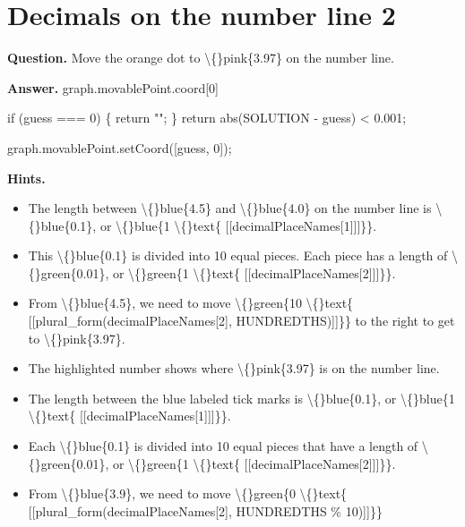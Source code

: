 \documentclass{article}
\begin{document}
\section*{Decimals on the number line 2}
\textbf{Question.} Move the orange dot to \textbackslash\{\}pink\{3.97\} on the number line.

\textbf{Answer.} graph.movablePoint.coord[0] 
                
                    if (guess === 0) \{
                        return "";
                    \}
                    return abs(SOLUTION - guess) < 0.001;
                
                
                    graph.movablePoint.setCoord([guess, 0]);

\textbf{Hints.}
\begin{itemize}
  \item The length between \textbackslash\{\}blue\{4.5\} and \textbackslash\{\}blue\{4.0\}
                    on the number line is \textbackslash\{\}blue\{0.1\},
                    or \textbackslash\{\}blue\{1 \textbackslash\{\}text\{ [[decimalPlaceNames[1]]]\}\}.
  \item This \textbackslash\{\}blue\{0.1\} is divided into 10 equal pieces.
                    Each piece has a length of \textbackslash\{\}green\{0.01\},
                    or \textbackslash\{\}green\{1 \textbackslash\{\}text\{ [[decimalPlaceNames[2]]]\}\}.
  \item From \textbackslash\{\}blue\{4.5\}, we need to move 
                        \textbackslash\{\}green\{10 \textbackslash\{\}text\{ [[plural\_form(decimalPlaceNames[2], HUNDREDTHS)]]\}\}
                        to the right to get to \textbackslash\{\}pink\{3.97\}.
  \item The highlighted number shows where \textbackslash\{\}pink\{3.97\} is on the number line.
  \item The length between the blue labeled tick marks is \textbackslash\{\}blue\{0.1\},
                    or \textbackslash\{\}blue\{1 \textbackslash\{\}text\{ [[decimalPlaceNames[1]]]\}\}.
  \item Each \textbackslash\{\}blue\{0.1\} is divided into 10 equal pieces
                    that have a length of \textbackslash\{\}green\{0.01\},
                    or \textbackslash\{\}green\{1 \textbackslash\{\}text\{ [[decimalPlaceNames[2]]]\}\}.
  \item From \textbackslash\{\}blue\{3.9\}, we need to move
                        \textbackslash\{\}green\{0 \textbackslash\{\}text\{ [[plural\_form(decimalPlaceNames[2], HUNDREDTHS \% 10)]]\}\}

\end{itemize}
\end{document}
